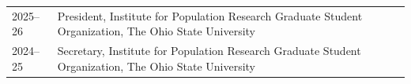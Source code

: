

% 
\begin{longtable}[l]{@{}p{} p{}}


    2025--26 & President, Institute for Population Research Graduate Student Organization, The Ohio State University \\

    2024--25 & Secretary, Institute for Population Research Graduate Student Organization, The Ohio State University \\

\end{longtable}



    


